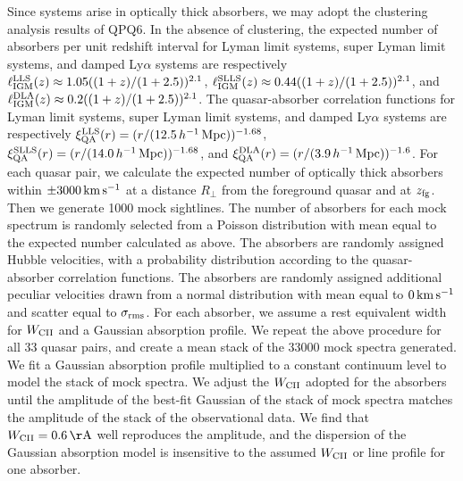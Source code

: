 \documentclass[iop]{emulateapj}
\begin{document}
Since  systems arise in optically thick absorbers, we may adopt the clustering analysis 
results of QPQ6. In the absence of clustering, the expected number of absorbers per unit redshift 
interval for Lyman limit systems, super Lyman limit systems, and damped Ly$\alpha$ systems are 
respectively $\ell_{\rm IGM}^{\rm LLS}(z)\approx1.05((1+z)/(1+2.5))^{2.1}$, 
$\ell_{\rm IGM}^{\rm SLLS}(z)\approx0.44((1+z)/(1+2.5))^{2.1}$, and 
$\ell_{\rm IGM}^{\rm DLA}(z)\approx0.2((1+z)/(1+2.5))^{2.1}$. The quasar-absorber correlation 
functions for Lyman limit systems, super Lyman limit systems, and damped Ly$\alpha$ systems are 
respectively $\xi_{\rm QA}^{\rm LLS}(r)=(r/(12.5\,h^{-1}\,{\rm Mpc}))^{-1.68}$, 
$\xi_{\rm QA}^{\rm SLLS}(r)=(r/(14.0\,h^{-1}\,{\rm Mpc}))^{-1.68}$, and 
$\xi_{\rm QA}^{\rm DLA}(r)=(r/(3.9\,h^{-1}\,{\rm Mpc}))^{-1.6}$. 
For each quasar pair, we calculate the expected number of optically thick absorbers within 
$\pm3000\,{\rm km\,s^{-1}}$ at a distance $R_\perp$ from the foreground quasar and at 
$z_{\rm fg}$. Then we generate 1000 mock sightlines. The number of absorbers for each mock 
spectrum is randomly selected from a Poisson distribution with mean equal to the expected number 
calculated as above. The absorbers are randomly assigned Hubble velocities, with a probability 
distribution according to the quasar-absorber correlation functions. The absorbers are randomly 
assigned additional peculiar velocities drawn from a normal distribution with mean equal to 
$0\,{\rm km\,s^{-1}}$ and scatter equal to $\sigma_{\rm rms}$. For each absorber, we assume a rest
equivalent width for  $W_{\rm CII}$ and a Gaussian absorption profile. We repeat the 
above procedure for all 33 quasar pairs, and create a mean stack of the 33000 mock spectra
generated. We fit a Gaussian absorption profile multiplied to a constant continuum level to model 
the stack of mock spectra. We adjust the $W_{\rm CII}$ adopted for the absorbers until the 
amplitude of the best-fit Gaussian of the stack of mock spectra matches the 
amplitude of the stack of the observational data. We find that $W_{\rm CII}=0.6\,{\rm \AA}$ well
reproduces the amplitude, and the dispersion of the Gaussian absorption model is 
insensitive to the assumed $W_{\rm CII}$ or line profile for one absorber. 
\end{document}

